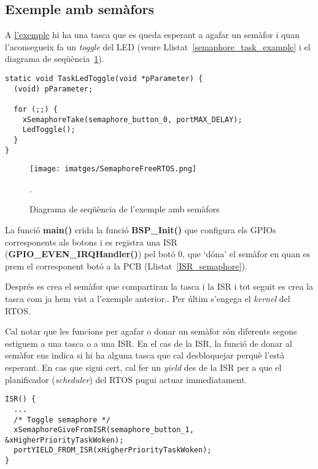 \subsection{Exemple amb semàfors}
\label{sub:semafors_exemple}
A \href{https://github.com/mariusmm/cursembedded/tree/master/Simplicity/FreeRTOS_Semaphore}{l'exemple} hi ha una tasca que es queda esperant a agafar un semàfor i quan l'aconsegueix fa un {\em toggle} del LED (veure Llistat~\ref{semaphore_task_example} i el diagrama de seqüència~\ref{fig:SeqDiagramSemaphore}).

\begin{lstlisting}[style=customc,caption=Tasca amb semàfor d'exemple,label=semaphore_task_example]
static void TaskLedToggle(void *pParameter) {
  (void) pParameter;

  for (;;) {
    xSemaphoreTake(semaphore_button_0, portMAX_DELAY);
    LedToggle();
  }
}
\end{lstlisting}


\begin{figure}
 \centering
 \texttt{[image: imatges/SemaphoreFreeRTOS.png]}
 \caption{Diagrama de seqüència de l'exemple amb semàfors}.
 \label{fig:SeqDiagramSemaphore}
\end{figure}


La funció {\bf main()} crida la funció {\bf BSP\_Init()} que configura els GPIOs corresponents als botons i es registra una \gls{ISR} ({\bf GPIO\_EVEN\_IRQHandler()}) pel botó 0, que ‘dóna' el semàfor en quan es prem el corresponent botó a la PCB (Llistat~\ref{ISR_semaphore}).

Després es crea el semàfor que compartiran la tasca i la ISR i tot seguit es crea la tasca com ja hem vist a l'exemple anterior..
Per últim s'engega el {\em kernel} del RTOS.

Cal notar que les funcions per agafar o donar un semàfor són diferents segons estiguem a una tasca o a una \gls{ISR}. En el cas de la ISR, la funció de donar al semàfor ens indica si hi ha alguna tasca que cal desbloquejar perquè l'està esperant. En cas que sigui cert, cal fer un {\em yield} des de la \gls{ISR} per a que el planificador ({\em scheduler}) del RTOS pugui actuar immediatament.

\begin{lstlisting}[caption=ISR del botó 0,style=customc,label=ISR_semaphore]
ISR() {
  ...
  /* Toggle semaphore */
  xSemaphoreGiveFromISR(semaphore_button_1, &xHigherPriorityTaskWoken);
  portYIELD_FROM_ISR(xHigherPriorityTaskWoken);
}
\end{lstlisting}

